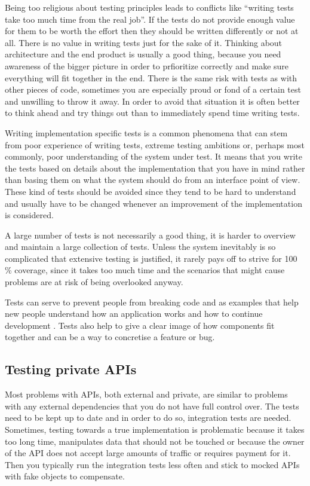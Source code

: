 \documentclass[11pt]{article}
\begin{document}
Being too religious about testing principles leads to conflicts like ``writing tests take too much time from the real job''. If the tests do not provide enough value for them to be worth the effort then they should be written differently or not at all. There is no value in writing tests just for the sake of it. Thinking about architecture and the end product is usually a good thing, because you need awareness of the bigger picture in order to prfioritize correctly and make sure everything will fit together in the end. There is the same risk with tests as with other pieces of code, sometimes you are especially proud or fond of a certain test and unwilling to throw it away. In order to avoid that situation it is often better to think ahead and try things out than to immediately spend time writing tests. \cite[question~27]{Edelstam}

Writing implementation specific tests is a common phenomena that can stem from poor experience of writing tests, extreme testing ambitions or, perhaps most commonly, poor understanding of the system under test. It means that you write the tests based on details about the implementation that you have in mind rather than basing them on what the system should do from an interface point of view. These kind of tests should be avoided since they tend to be hard to understand and usually have to be changed whenever an improvement of the implementation is considered.

A large number of tests is not necessarily a good thing, it is harder to overview and maintain a large collection of tests. Unless the system inevitably is so complicated that extensive testing is justified, it rarely pays off to strive for 100 \% coverage, since it takes too much time and the scenarios that might cause problems are at risk of being overlooked anyway. \cite[question~28]{Edelstam}

Tests can serve to prevent people from breaking code and as examples that help new people understand how an application works and how to continue development \cite[questions~31-32]{Edelstam}. Tests also help to give a clear image of how components fit together and can be a way to concretise a feature or bug.

\subsection{Testing private APIs}

Most problems with APIs, both external and private, are similar to problems with any external dependencies that you do not have full control over. The tests need to be kept up to date and in order to do so, integration tests are needed. Sometimes, testing towards a true implementation is problematic because it takes too long time, manipulates data that should not be touched or because the owner of the API does not accept large amounts of traffic or requires payment for it. Then you typically run the integration tests less often and stick to mocked APIs with fake objects to compensate. \cite[questions~19-20]{Stenmark}
\end{document}
